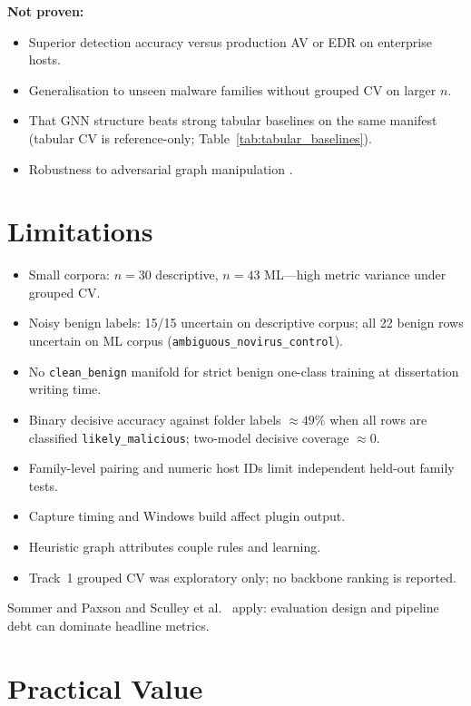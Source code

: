 \textbf{Not proven:}
\begin{itemize}
\item Superior detection accuracy versus production AV or EDR on enterprise hosts.
\item Generalisation to unseen malware families without grouped CV on larger $n$.
\item That GNN structure beats strong tabular baselines on the same manifest (tabular CV is reference-only; Table~\ref{tab:tabular_baselines}).
\item Robustness to adversarial graph manipulation \cite{apruzzese2023sok}.
\end{itemize}

\section{Limitations}

\begin{itemize}
\item Small corpora: $n{=}30$ descriptive, $n{=}43$ ML---high metric variance under grouped CV.
\item Noisy benign labels: 15/15 uncertain on descriptive corpus; all 22 benign rows uncertain on ML corpus (\texttt{ambiguous\_novirus\_control}).
\item No \texttt{clean\_benign} manifold for strict benign one-class training at dissertation writing time.
\item Binary decisive accuracy against folder labels ${\approx}49\%$ when all rows are classified \texttt{likely\_malicious}; two-model decisive coverage ${\approx}0$.
\item Family-level pairing and numeric host IDs limit independent held-out family tests.
\item Capture timing and Windows build affect plugin output.
\item Heuristic graph attributes couple rules and learning.
\item Track~1 grouped CV was exploratory only; no backbone ranking is reported.
\end{itemize}

Sommer and Paxson \cite{sommer2010outside} and Sculley et al.\ \cite{sculley2015debt} apply: evaluation design and pipeline debt can dominate headline metrics.

\section{Practical Value}

